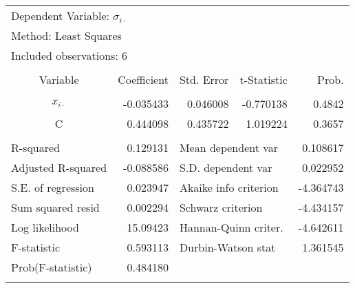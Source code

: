 \begin{tabular}{lrrrr}
\toprule
\multicolumn{2}{l}{Dependent Variable: $\sigma_{i\cdot}$}&\multicolumn{1}{c}{}&\multicolumn{1}{c}{}&\multicolumn{1}{c}{}\\
\multicolumn{2}{l}{Method: Least Squares}&\multicolumn{1}{c}{}&\multicolumn{1}{c}{}&\multicolumn{1}{c}{}\\
\multicolumn{2}{l}{Included observations: 6}&\multicolumn{1}{c}{}&\multicolumn{1}{c}{}&\multicolumn{1}{c}{}\\
[4.5pt] \midrule  \\ [-4.5pt]
\multicolumn{1}{c}{Variable}&\multicolumn{1}{r}{Coefficient}&\multicolumn{1}{r}{Std. Error}&\multicolumn{1}{r}{t-Statistic}&\multicolumn{1}{r}{Prob.}\\
[4.5pt] \midrule  \\ [-4.5pt]
\multicolumn{1}{c}{$x_{i\cdot}$}&\multicolumn{1}{r}{-0.035433}&\multicolumn{1}{r}{0.046008}&\multicolumn{1}{r}{-0.770138}&\multicolumn{1}{r}{0.4842}\\
\multicolumn{1}{c}{C}&\multicolumn{1}{r}{0.444098}&\multicolumn{1}{r}{0.435722}&\multicolumn{1}{r}{1.019224}&\multicolumn{1}{r}{0.3657}\\
[4.5pt] \midrule \\ [-4.5pt]
\multicolumn{1}{l}{R-squared}&\multicolumn{1}{r}{0.129131}&\multicolumn{2}{l}{Mean dependent var}&\multicolumn{1}{r}{0.108617}\\
\multicolumn{1}{l}{Adjusted R-squared}&\multicolumn{1}{r}{-0.088586}&\multicolumn{2}{l}{S.D. dependent var}&\multicolumn{1}{r}{0.022952}\\
\multicolumn{1}{l}{S.E. of regression}&\multicolumn{1}{r}{0.023947}&\multicolumn{2}{l}{Akaike info criterion}&\multicolumn{1}{r}{-4.364743}\\
\multicolumn{1}{l}{Sum squared resid}&\multicolumn{1}{r}{0.002294}&\multicolumn{2}{l}{Schwarz criterion}&\multicolumn{1}{r}{-4.434157}\\
\multicolumn{1}{l}{Log likelihood}&\multicolumn{1}{r}{15.09423}&\multicolumn{2}{l}{Hannan-Quinn criter.}&\multicolumn{1}{r}{-4.642611}\\
\multicolumn{1}{l}{F-statistic}&\multicolumn{1}{r}{0.593113}&\multicolumn{2}{l}{Durbin-Watson stat}&\multicolumn{1}{r}{1.361545}\\
\multicolumn{1}{l}{Prob(F-statistic)}&\multicolumn{1}{r}{0.484180}&\multicolumn{1}{c}{}&\multicolumn{1}{c}{}&\multicolumn{1}{c}{}\\
[4.5pt] \bottomrule \\
\end{tabular}